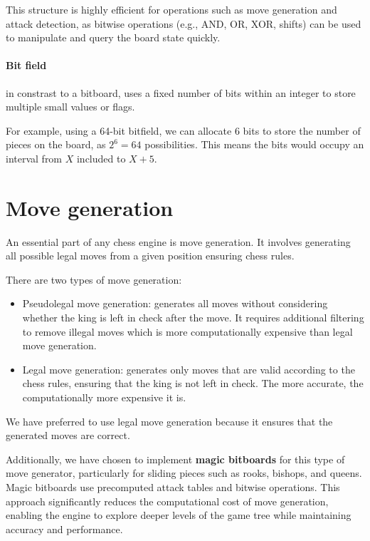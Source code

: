 \noindent This structure is highly efficient for operations such as move generation and attack detection, as bitwise operations (e.g., AND, OR, XOR, shifts) can be used to manipulate and query the board state quickly.

\paragraph{Bit field} in constrast to a bitboard, uses a fixed number of bits within an integer to store multiple small values or flags.

\vspace{1em}

\noindent For example, using a 64-bit bitfield, we can allocate 6 bits to store the number of pieces on the board, as $2^6 = 64$ possibilities. This means the bits would occupy an interval from $X$ included to $X+5$.

\section{Move generation}
\label{sec:move-generation}

An essential part of any chess engine is move generation. It involves generating all possible legal moves from a given position ensuring chess rules.

\vspace{1em}

\noindent There are two types of move generation:

\begin{itemize}
    \item Pseudolegal move generation: generates all moves without considering whether the king is left in check after the move. It requires additional filtering to remove illegal moves which is more computationally expensive than legal move generation.
    \item Legal move generation: generates only moves that are valid according to the chess rules, ensuring that the king is not left in check. The more accurate, the computationally more expensive it is.
\end{itemize}

\noindent We have preferred to use legal move generation because it ensures that the generated moves are correct.

\vspace{1em}

\noindent Additionally, we have chosen to implement \textbf{magic bitboards} for this type of move generator, particularly for sliding pieces such as rooks, bishops, and queens. Magic bitboards use precomputed attack tables and bitwise operations. This approach significantly reduces the computational cost of move generation, enabling the engine to explore deeper levels of the game tree while maintaining accuracy and performance.

